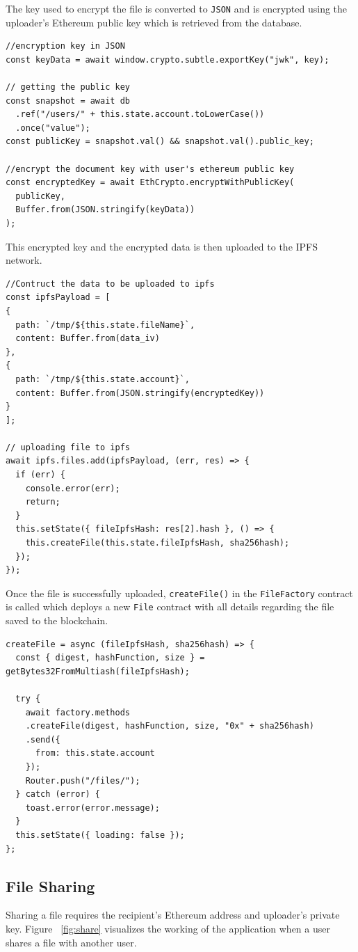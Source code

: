 \documentclass[]{article}
\begin{document}
		The key used to encrypt the file is converted to \texttt{JSON} and is encrypted using the uploader's Ethereum public key which is retrieved from the database.
		
\begin{verbatim}
//encryption key in JSON
const keyData = await window.crypto.subtle.exportKey("jwk", key);

// getting the public key
const snapshot = await db
  .ref("/users/" + this.state.account.toLowerCase())
  .once("value");
const publicKey = snapshot.val() && snapshot.val().public_key;

//encrypt the document key with user's ethereum public key
const encryptedKey = await EthCrypto.encryptWithPublicKey(
  publicKey,
  Buffer.from(JSON.stringify(keyData))
);
\end{verbatim}

		This encrypted key and the encrypted data is then uploaded to the IPFS network.
		
\begin{verbatim}
//Contruct the data to be uploaded to ipfs
const ipfsPayload = [
{
  path: `/tmp/${this.state.fileName}`,
  content: Buffer.from(data_iv)
},
{
  path: `/tmp/${this.state.account}`,
  content: Buffer.from(JSON.stringify(encryptedKey))
}
];

// uploading file to ipfs
await ipfs.files.add(ipfsPayload, (err, res) => {
  if (err) {
    console.error(err);
    return;
  }
  this.setState({ fileIpfsHash: res[2].hash }, () => {
    this.createFile(this.state.fileIpfsHash, sha256hash);
  });
});
\end{verbatim}

		Once the file is successfully uploaded, \texttt{createFile()} in the \texttt{FileFactory} contract is called which deploys a new \texttt{File} contract with all details regarding the file saved to the blockchain.
		
\begin{verbatim}
createFile = async (fileIpfsHash, sha256hash) => {
  const { digest, hashFunction, size } = getBytes32FromMultiash(fileIpfsHash);

  try {
    await factory.methods
    .createFile(digest, hashFunction, size, "0x" + sha256hash)
    .send({
      from: this.state.account
    });
    Router.push("/files/");
  } catch (error) {
    toast.error(error.message);
  }
  this.setState({ loading: false });
};
\end{verbatim}
		
		\newpage
		\subsection{File Sharing}
		Sharing a file requires the recipient's Ethereum address and uploader's private key. Figure ~\ref{fig:share} visualizes the working of the application when a user shares a file with another user.
		
\end{document}
